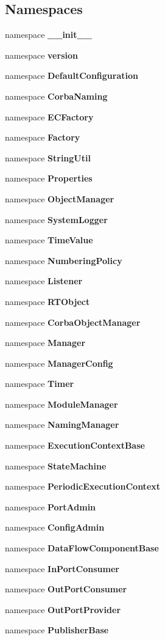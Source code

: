 \subsection*{Namespaces}
\begin{CompactItemize}
\item 
namespace {\bf \_\-\_\-init\_\-\_\-}
\item 
namespace {\bf version}
\item 
namespace {\bf Default\-Configuration}
\item 
namespace {\bf Corba\-Naming}
\item 
namespace {\bf ECFactory}
\item 
namespace {\bf Factory}
\item 
namespace {\bf String\-Util}
\item 
namespace {\bf Properties}
\item 
namespace {\bf Object\-Manager}
\item 
namespace {\bf System\-Logger}
\item 
namespace {\bf Time\-Value}
\item 
namespace {\bf Numbering\-Policy}
\item 
namespace {\bf Listener}
\item 
namespace {\bf RTObject}
\item 
namespace {\bf Corba\-Object\-Manager}
\item 
namespace {\bf Manager}
\item 
namespace {\bf Manager\-Config}
\item 
namespace {\bf Timer}
\item 
namespace {\bf Module\-Manager}
\item 
namespace {\bf Naming\-Manager}
\item 
namespace {\bf Execution\-Context\-Base}
\item 
namespace {\bf State\-Machine}
\item 
namespace {\bf Periodic\-Execution\-Context}
\item 
namespace {\bf Port\-Admin}
\item 
namespace {\bf Config\-Admin}
\item 
namespace {\bf Data\-Flow\-Component\-Base}
\item 
namespace {\bf In\-Port\-Consumer}
\item 
namespace {\bf Out\-Port\-Consumer}
\item 
namespace {\bf Out\-Port\-Provider}
\item 
namespace {\bf Publisher\-Base}

\end{CompactItemize}
